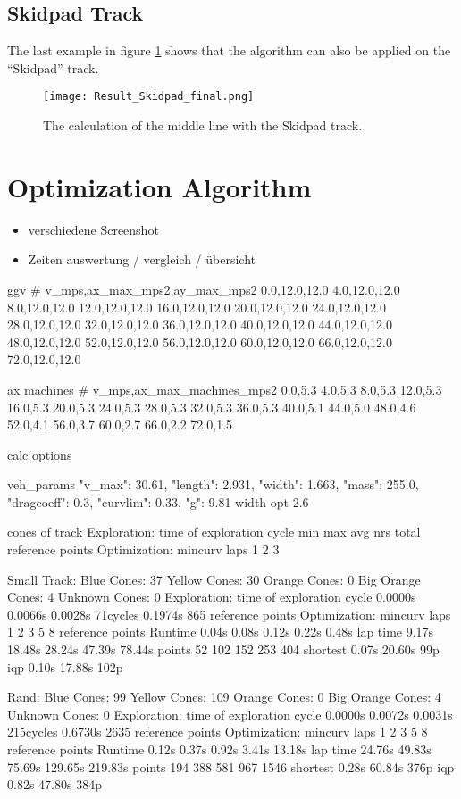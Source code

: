 \subsection{Skidpad Track} \label{sec:Results Skidpad Track}
The last example in figure \ref{fig:Result Skidpad Final} shows that the algorithm can also be applied on the ``Skidpad'' track.
\begin{figure}[H]
    \centering
    \texttt{[image: Result\_Skidpad\_final.png]}
    \caption{The calculation of the middle line with the Skidpad track.}
    \label{fig:Result Skidpad Final}
\end{figure}

\section{Optimization Algorithm}
\begin{itemize}
    \item verschiedene Screenshot
    \item Zeiten auswertung / vergleich / übersicht
\end{itemize}
ggv
# v_mps,ax_max_mps2,ay_max_mps2
0.0,12.0,12.0
4.0,12.0,12.0
8.0,12.0,12.0
12.0,12.0,12.0
16.0,12.0,12.0
20.0,12.0,12.0
24.0,12.0,12.0
28.0,12.0,12.0
32.0,12.0,12.0
36.0,12.0,12.0
40.0,12.0,12.0
44.0,12.0,12.0
48.0,12.0,12.0
52.0,12.0,12.0
56.0,12.0,12.0
60.0,12.0,12.0
66.0,12.0,12.0
72.0,12.0,12.0

ax machines
# v_mps,ax_max_machines_mps2
0.0,5.3
4.0,5.3
8.0,5.3
12.0,5.3
16.0,5.3
20.0,5.3
24.0,5.3
28.0,5.3
32.0,5.3
36.0,5.3
40.0,5.1
44.0,5.0
48.0,4.6
52.0,4.1
56.0,3.7
60.0,2.7
66.0,2.2
72.0,1.5

calc options

veh_params
"v_max": 30.61,
"length": 2.931,
"width": 1.663,
"mass": 255.0,
"dragcoeff": 0.3,
"curvlim": 0.33,
"g": 9.81
width opt 2.6

cones of track
Exploration:
time of exploration cycle
min max avg nrs total
reference points
Optimization:
mincurv laps 1 2 3

Small Track:
Blue Cones: 37
Yellow Cones: 30
Orange Cones: 0
Big Orange Cones: 4
Unknown Cones: 0
Exploration:
time of exploration cycle
0.0000s 0.0066s 0.0028s 71cycles 0.1974s
865 reference points
Optimization:
mincurv laps 1 2 3 5 8
reference points
Runtime 0.04s 0.08s 0.12s 0.22s 0.48s
lap time 9.17s 18.48s 28.24s 47.39s 78.44s
points 52 102 152 253 404
shortest 0.07s 20.60s 99p
iqp 0.10s 17.88s 102p

Rand:
Blue Cones: 99
Yellow Cones: 109
Orange Cones: 0
Big Orange Cones: 4
Unknown Cones: 0
Exploration:
time of exploration cycle
0.0000s 0.0072s 0.0031s 215cycles 0.6730s
2635 reference points
Optimization:
mincurv laps 1 2 3 5 8
reference points
Runtime 0.12s 0.37s 0.92s 3.41s 13.18s
lap time 24.76s 49.83s 75.69s 129.65s 219.83s
points 194 388 581 967 1546
shortest 0.28s 60.84s 376p
iqp 0.82s 47.80s 384p

